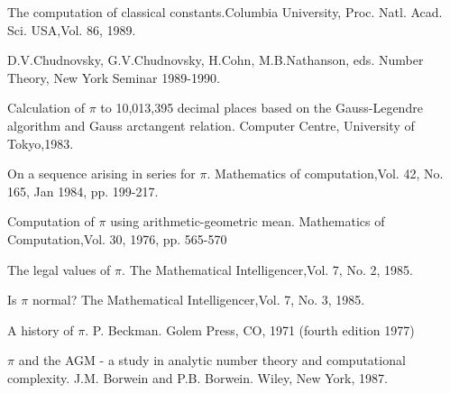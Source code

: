     {The computation of classical constants.}{Columbia University,
    Proc. Natl. Acad. Sci. USA,}{Vol. 86, 1989.}

    {D.V.Chudnovsky, G.V.Chudnovsky, H.Cohn, M.B.Nathanson, eds.}
    {Number Theory, New York Seminar 1989-1990.}

    {Calculation of $\pi$ to 10,013,395 decimal places based on the
    Gauss-Legendre algorithm and Gauss arctangent relation.}
    {Computer Centre, University of Tokyo,}{1983.}

    {On a sequence arising in series for $\pi$.}
    {Mathematics of computation,}{Vol. 42, No. 165, Jan 1984,
    pp. 199-217.}

    {Computation of $\pi$ using arithmetic-geometric mean.}
    {Mathematics of Computation,}{Vol. 30, 1976, pp. 565-570}

    {The legal values of $\pi$.}
    {The Mathematical Intelligencer,}{Vol. 7, No. 2, 1985.}

    {Is $\pi$ normal?}
    {The Mathematical Intelligencer,}{Vol. 7, No. 3, 1985.}

\medskip

    \book
    {A history of $\pi$.}
    {P. Beckman.}
    {Golem Press, CO, 1971 (fourth edition 1977)}


    \book
    {$\pi$ and the AGM - a study in analytic number theory and
    computational complexity.}
    {J.M. Borwein and P.B. Borwein.}
    {Wiley, New York, 1987.}



